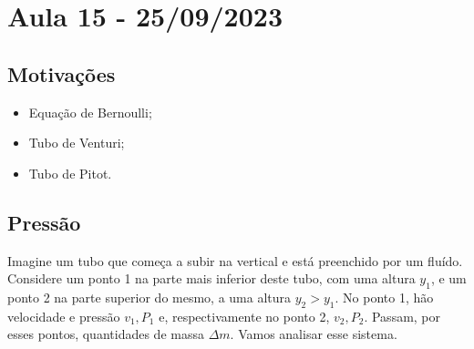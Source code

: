 \documentclass[PhysicsII/physicsII_notes.tex]{subfiles}
\begin{document}
\section{Aula 15 - 25/09/2023}
\subsection{Motivações}
\begin{itemize}
	\item Equação de Bernoulli;
	\item Tubo de Venturi;
	\item Tubo de Pitot.
\end{itemize}
\subsection{Pressão}
Imagine um tubo que começa a subir na vertical e está preenchido por um fluído. Considere um ponto 1 na parte mais inferior deste tubo, com uma altura \(y_{1}\),
e um ponto 2 na parte superior do mesmo, a uma altura \(y_{2} > y_{1}\). No ponto 1, hão velocidade e pressão \(v_{1}, P_{1}\) e, respectivamente no ponto 2, \(v_{2}, P_{2}\).
Passam, por esses pontos, quantidades de massa \(\Delta m\). Vamos analisar esse sistema.
\end{document}
